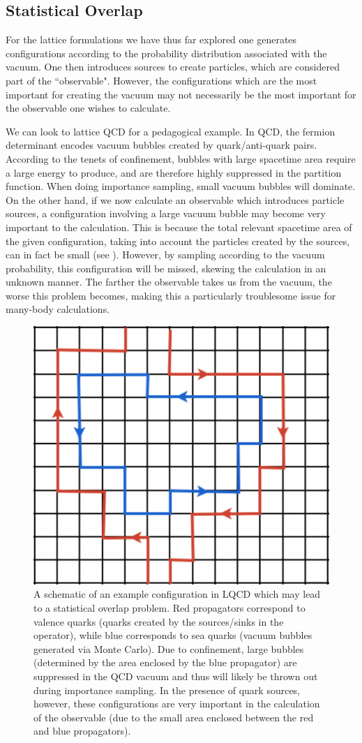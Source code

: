 \subsection{\label{sec:overlap}Statistical Overlap}

For the lattice formulations we have thus far explored one generates configurations according to the probability distribution associated with the vacuum. One then introduces sources to create particles, which are considered part of the ``observable". However, the configurations which are the most important for creating the vacuum may not necessarily be the most important for the observable one wishes to calculate. 

We can look to lattice QCD for a pedagogical example. In QCD, the fermion determinant encodes vacuum bubbles created by quark/anti-quark pairs. According to the tenets of confinement, bubbles with large spacetime area require a large energy to produce, and are therefore highly suppressed in the partition function. When doing importance sampling, small vacuum bubbles will dominate. On the other hand, if we now calculate an observable which introduces particle sources, a configuration involving a large vacuum bubble may become very important to the calculation. This is because the total relevant spacetime area of the given configuration, taking into account the particles created by the sources, can in fact be small (see ). However, by sampling according to the vacuum probability, this configuration will be missed, skewing the calculation in an unknown manner. The farther the observable takes us from the vacuum, the worse this problem becomes, making this a particularly troublesome issue for many-body calculations.

\begin{figure}
\caption{\label{fig:QCDbubble}A schematic of an example configuration in LQCD which may lead to a statistical overlap problem. Red propagators correspond to valence quarks (quarks created by the sources/sinks in the operator), while blue corresponds to sea quarks (vacuum bubbles generated via Monte Carlo). Due to confinement, large bubbles (determined by the area enclosed by the blue propagator) are suppressed in the QCD vacuum and thus will likely be thrown out during importance sampling. In the presence of quark sources, however, these configurations are very important in the calculation of the observable (due to the small area enclosed between the red and blue propagators).}
\includegraphics[width=0.3\linewidth]{Chapter5-figures/QCDbubble.pdf}
\end{figure}

